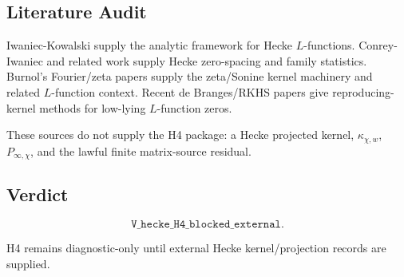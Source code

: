 \subsection*{Literature Audit}

Iwaniec-Kowalski supply the analytic framework for Hecke \(L\)-functions.
Conrey-Iwaniec and related work supply Hecke zero-spacing and family
statistics. Burnol's Fourier/zeta papers supply the zeta/Sonine kernel
machinery and related \(L\)-function context. Recent de Branges/RKHS papers
give reproducing-kernel methods for low-lying \(L\)-function zeros.

These sources do not supply the H4 package: a Hecke projected kernel,
\(\kappa_{\chi,w}\), \(P_{\infty,\chi}\), and the lawful finite
matrix-source residual.

\subsection*{Verdict}

\[
\texttt{V\_hecke\_H4\_blocked\_external}.
\]

H4 remains diagnostic-only until external Hecke kernel/projection records are
supplied.
